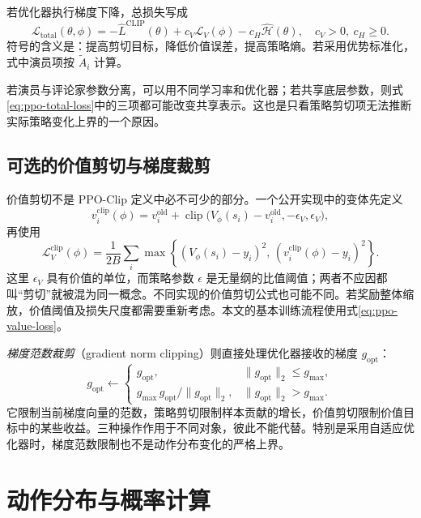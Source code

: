 \documentclass[UTF8,12pt,a4paper,fontset=fandol]{ctexart}
\begin{document}
若优化器执行梯度下降，总损失写成
\begin{equation}
  \mathcal L_{\mathrm{total}}(\theta,\phi)
  =-\widehat L^{\mathrm{CLIP}}(\theta)
   +c_V\mathcal L_V(\phi)
   -c_H\widehat{\mathcal H}(\theta),
  \quad c_V>0,\ c_H\ge0.
  \label{eq:ppo-total-loss}
\end{equation}
符号的含义是：提高剪切目标，降低价值误差，提高策略熵。若采用优势标准化，式中演员项按 $\widetilde A_i$ 计算。

若演员与评论家参数分离，可以用不同学习率和优化器；若共享底层参数，则式\eqref{eq:ppo-total-loss}中的三项都可能改变共享表示。这也是只看策略剪切项无法推断实际策略变化上界的一个原因。

\subsection{可选的价值剪切与梯度裁剪}

价值剪切不是 PPO-Clip 定义中必不可少的部分。一个公开实现中的变体\cite{openai-baselines-ppo2}先定义
\[
  v_i^{\mathrm{clip}}(\phi)
  =v_i^{\mathrm{old}}
   +\operatorname{clip}\bigl(
      V_\phi(s_i)-v_i^{\mathrm{old}},-\epsilon_V,\epsilon_V
    \bigr),
\]
再使用
\begin{equation}
  \mathcal L_V^{\mathrm{clip}}(\phi)
  =\frac1{2B}\sum_i
    \max\left\{
      (V_\phi(s_i)-y_i)^2,\,
      (v_i^{\mathrm{clip}}(\phi)-y_i)^2
    \right\}.
  \label{eq:ppo-value-clipping}
\end{equation}
这里 $\epsilon_V$ 具有价值的单位，而策略参数 $\epsilon$ 是无量纲的比值阈值；两者不应因都叫“剪切”就被混为同一概念。不同实现的价值剪切公式也可能不同。若奖励整体缩放，价值阈值及损失尺度都需要重新考虑。本文的基本训练流程使用式\eqref{eq:ppo-value-loss}。

\emph{梯度范数裁剪}（gradient norm clipping）则直接处理优化器接收的梯度 $g_{\mathrm{opt}}$：
\[
  g_{\mathrm{opt}}
  \leftarrow
  \begin{cases}
    g_{\mathrm{opt}},&\|g_{\mathrm{opt}}\|_2\le g_{\max},\\
    g_{\max}\,g_{\mathrm{opt}}/\|g_{\mathrm{opt}}\|_2,
       &\|g_{\mathrm{opt}}\|_2>g_{\max}.
  \end{cases}
\]
它限制当前梯度向量的范数，策略剪切限制样本贡献的增长，价值剪切限制价值目标中的某些收益。三种操作作用于不同对象，彼此不能代替。特别是采用自适应优化器时，梯度范数限制也不是动作分布变化的严格上界。

\section{动作分布与概率计算}
\label{sec:ppo-action-distributions}
\end{document}
